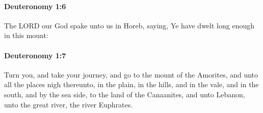 		\paragraph{Deuteronomy 1:6} %
			\label{DEUTERONOMY-1-6}

			The LORD our God spake unto us in Horeb, saying, Ye have dwelt long enough in this mount:


		\paragraph{Deuteronomy 1:7} %
			\label{DEUTERONOMY-1-7}

			Turn you, and take your journey, and go to the mount of the Amorites, and unto all the places nigh thereunto, in the plain, in the hills, and in the vale, and in the south, and by the sea side, to the land of the Canaanites, and unto Lebanon, unto the great river, the river Euphrates.

